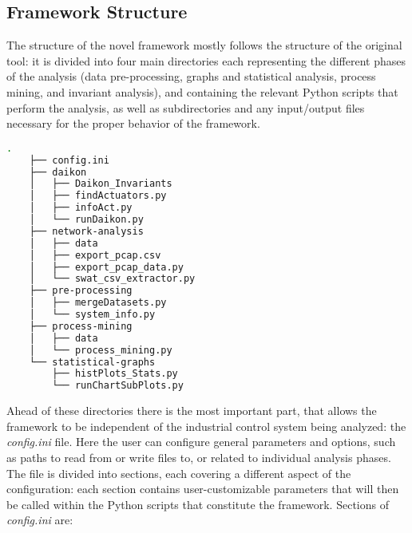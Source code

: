 \subsection{Framework Structure}
\label{subsec:framework_struct}
The structure of the novel framework mostly follows the structure of the original tool: it is divided into four main directories each representing the different phases of the analysis (data pre-processing, graphs and statistical analysis, process mining, and invariant analysis), and containing the relevant Python scripts that perform the analysis, as well as subdirectories and any input/output files necessary for the proper behavior of the framework.

\begin{lstlisting}[language=bash, numbers=none, caption=Novel Framework structure, label=lst:4_tree_command]
	.
	├── config.ini
	├── daikon
	│   ├── Daikon_Invariants
	│   ├── findActuators.py
	│   ├── infoAct.py
	│   └── runDaikon.py
	├── network-analysis
	│   ├── data
	│   ├── export_pcap.csv
	│   ├── export_pcap_data.py
	│   └── swat_csv_extractor.py
	├── pre-processing
	│   ├── mergeDatasets.py
	│   └── system_info.py
	├── process-mining
	│   ├── data
	│   └── process_mining.py
	└── statistical-graphs
	    ├── histPlots_Stats.py
	    └── runChartSubPlots.py
\end{lstlisting}

Ahead of these directories there is the most important part, that allows the framework to be independent of the industrial control system being analyzed: the \textit{config.ini} file. Here the user can configure general parameters and options, such as paths to read from or write files to, or related to individual analysis phases.\newline
The file is divided into sections, each covering a different aspect of 
the configuration: each section contains user-customizable parameters 
that will then be called within the Python scripts that constitute the framework. Sections of \textit{config.ini} are:

